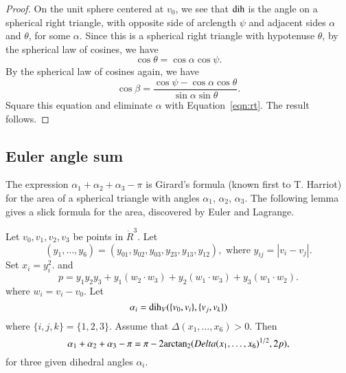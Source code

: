 \begin{proof}  On the unit sphere centered at $v_0$, we see that
$\operatorname{dih}$ is the angle on a spherical right triangle,
with opposite side of arclength $\psi$ and adjacent sides $\alpha$
and $\theta$, for some $\alpha$. 
 Since this is a spherical right triangle with hypotenuse
$\theta$, by the spherical law of cosines, we have
   \begin{equation}\label{eqn:rt}
     \cos\theta = \cos\alpha \cos\psi.
     \end{equation}
By the spherical law of cosines again, we have
    $$
    \cos\beta = \frac{\cos\psi - \cos\alpha\cos\theta}{\sin\alpha\sin\theta}.
    $$
Square this equation and eliminate $\alpha$ with Equation~\ref{eqn:rt}.
The result follows.
\end{proof}




\subsection{Euler angle sum}

The expression $\alpha_1+\alpha_2+\alpha_3-\pi$ is Girard's
formula (known first to T. Harriot) 
for the area of a spherical triangle with angles
$\alpha_1$, $\alpha_2$, $\alpha_3$.  The following lemma
gives a slick formula for the area, discovered by
Euler and Lagrange.

\begin{lemma}\label{lemma:euler}
Let $v_0,v_1,v_2,v_3$ be points in $\ring{R}^3$. 
Let 
  $$(y_1,\ldots,y_6) =(y_{01},y_{02},y_{03},y_{23},y_{13},y_{12}),
   \text{ where } y_{ij}=|v_i-v_j|.$$
Set
$x_i = y_i^2$.   
and
    $$
    p = y_1 y_2 y_3 + y_1 (w_2\cdot w_3) + y_2 (w_1\cdot w_3) + y_3
    (w_1\cdot w_2).
    $$
where $w_i = v_i- v_0$.
Let $$\alpha_i =\operatorname{dih}_V(\{v_0,v_i\},\{v_j,v_k\})$$
where $\{i,j,k\}=\{1,2,3\}$.
Assume that $\Delta(x_1,\ldots,x_6)>0$. 
Then
    $$
    \alpha_1+\alpha_2+\alpha_3 - \pi
     = {\pi} - 2{\operatorname{arctan_2}}({Delta(x_1,\ldots,x_6)^{1/2}},{2 p}),
    $$
for three given dihedral angles $\alpha_i$.
\end{lemma}

